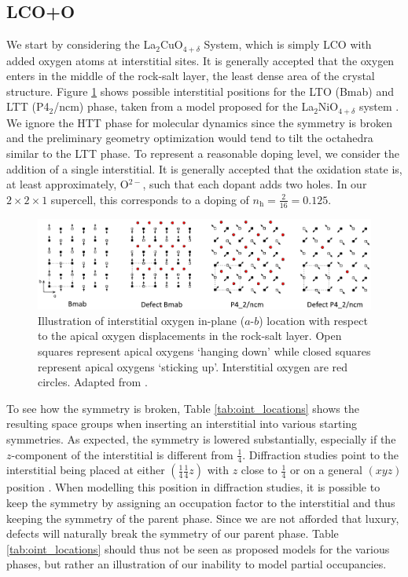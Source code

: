 \subsection{LCO+O}
We start by considering the La$_2$CuO$_{4+\delta}$ System, which is simply LCO with added oxygen atoms at interstitial sites. It is generally accepted that the oxygen enters in the middle of the rock-salt layer, the least dense area of the crystal structure. Figure \ref{fig:oint_location} shows possible interstitial positions for the LTO (Bmab) and LTT (P4$_2$/ncm) phase, taken from a model proposed for the La$_2$NiO$_{4+\delta}$ system \cite{Tranquada1994}. We ignore the HTT phase for molecular dynamics since the symmetry is broken and the preliminary geometry optimization would tend to tilt the octahedra similar to the LTT phase. To represent a reasonable doping level, we consider the addition of a single interstitial. It is generally accepted that the oxidation state is, at least approximately, O$^{2-}$, such that each dopant adds two holes. In our $2 \times 2 \times 1$ supercell, this corresponds to a doping of $n_\text{h} = \frac{2}{16} = 0.125$.

\begin{figure}
    \centering
    \includegraphics[width=\textwidth]{fig/md/oint.png}
    \caption[Illustration of interstitial positions]{Illustration of interstitial oxygen in-plane ($a$-$b$) location with respect to the apical oxygen displacements in the rock-salt layer. Open squares represent apical oxygens `hanging down' while closed squares represent apical oxygens `sticking up'. Interstitial oxygen are red circles. Adapted from \cite{Tranquada1994}.}
    \label{fig:oint_location}
\end{figure}

To see how the symmetry is broken, Table \ref{tab:oint_locations} shows the resulting space groups when inserting an interstitial into various starting symmetries. As expected, the symmetry is lowered substantially, especially if the $z$-component of the interstitial is different from $\frac{1}{4}$. Diffraction studies point to the interstitial being placed at either $\left(\frac{1}{4}  \frac{1}{4} z \right)$ with $z$ close to $\frac{1}{4}$ or on a general $(xyz)$ position \cite{Rial1997}. When modelling this position in diffraction studies, it is possible to keep the symmetry by assigning an occupation factor to the interstitial and thus keeping the symmetry of the parent phase. Since we are not afforded that luxury, defects will naturally break the symmetry of our parent phase. Table \ref{tab:oint_locations} should thus not be seen as proposed models for the various phases, but rather an illustration of our inability to model partial occupancies.

